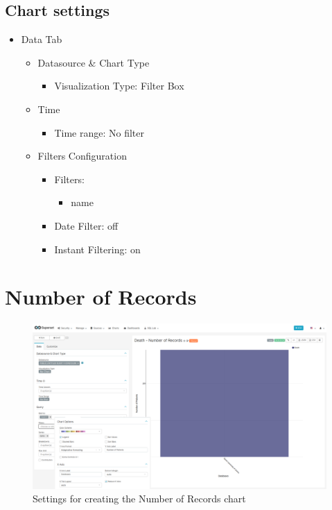 \documentclass[
]{book}
\providecommand{\tightlist}{%
  \setlength{\itemsep}{0pt}\setlength{\parskip}{0pt}}
\begin{document}
\hypertarget{chart-settings-19}{%
\subsection{Chart settings}\label{chart-settings-19}}

\begin{itemize}
\tightlist
\item
  Data Tab

  \begin{itemize}
  \tightlist
  \item
    Datasource \& Chart Type

    \begin{itemize}
    \tightlist
    \item
      Visualization Type: Filter Box
    \end{itemize}
  \item
    Time

    \begin{itemize}
    \tightlist
    \item
      Time range: No filter
    \end{itemize}
  \item
    Filters Configuration

    \begin{itemize}
    \tightlist
    \item
      Filters:

      \begin{itemize}
      \tightlist
      \item
        name
      \end{itemize}
    \item
      Date Filter: off
    \item
      Instant Filtering: on
    \end{itemize}
  \end{itemize}
\end{itemize}

\hypertarget{number-of-records}{%
\section{Number of Records}\label{number-of-records}}

\begin{figure}
\includegraphics[width=1\linewidth]{images/07-death/02-number_of_records} \caption{Settings for creating the Number of Records chart}\label{fig:numberOfRecords}
\end{figure}
\end{document}
